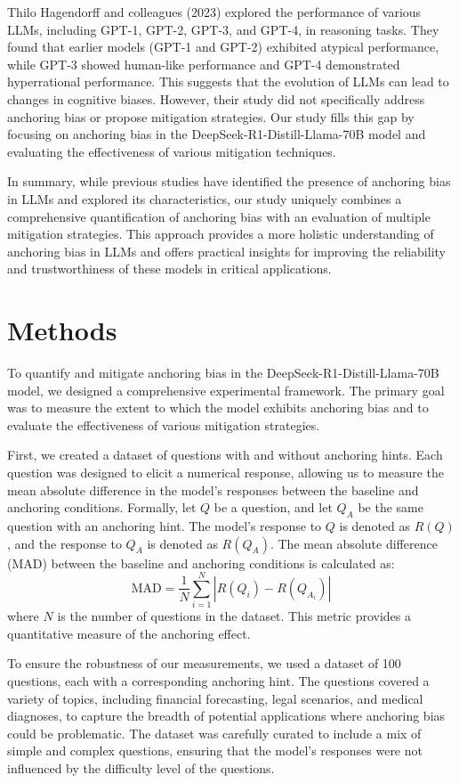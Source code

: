 \documentclass{article}
\begin{document}
Thilo Hagendorff and colleagues (2023) explored the performance of various LLMs, including GPT-1, GPT-2, GPT-3, and GPT-4, in reasoning tasks. They found that earlier models (GPT-1 and GPT-2) exhibited atypical performance, while GPT-3 showed human-like performance and GPT-4 demonstrated hyperrational performance. This suggests that the evolution of LLMs can lead to changes in cognitive biases. However, their study did not specifically address anchoring bias or propose mitigation strategies. Our study fills this gap by focusing on anchoring bias in the DeepSeek-R1-Distill-Llama-70B model and evaluating the effectiveness of various mitigation techniques.

In summary, while previous studies have identified the presence of anchoring bias in LLMs and explored its characteristics, our study uniquely combines a comprehensive quantification of anchoring bias with an evaluation of multiple mitigation strategies. This approach provides a more holistic understanding of anchoring bias in LLMs and offers practical insights for improving the reliability and trustworthiness of these models in critical applications.

\section{Methods}
To quantify and mitigate anchoring bias in the DeepSeek-R1-Distill-Llama-70B model, we designed a comprehensive experimental framework. The primary goal was to measure the extent to which the model exhibits anchoring bias and to evaluate the effectiveness of various mitigation strategies. 

First, we created a dataset of questions with and without anchoring hints. Each question was designed to elicit a numerical response, allowing us to measure the mean absolute difference in the model's responses between the baseline and anchoring conditions. Formally, let \( Q \) be a question, and let \( Q_A \) be the same question with an anchoring hint. The model's response to \( Q \) is denoted as \( R(Q) \), and the response to \( Q_A \) is denoted as \( R(Q_A) \). The mean absolute difference (MAD) between the baseline and anchoring conditions is calculated as:
\[
\text{MAD} = \frac{1}{N} \sum_{i=1}^{N} |R(Q_i) - R(Q_{A_i})|
\]
where \( N \) is the number of questions in the dataset. This metric provides a quantitative measure of the anchoring effect.

To ensure the robustness of our measurements, we used a dataset of 100 questions, each with a corresponding anchoring hint. The questions covered a variety of topics, including financial forecasting, legal scenarios, and medical diagnoses, to capture the breadth of potential applications where anchoring bias could be problematic. The dataset was carefully curated to include a mix of simple and complex questions, ensuring that the model's responses were not influenced by the difficulty level of the questions.
\end{document}

